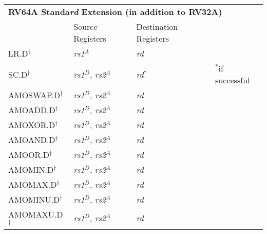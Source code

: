 \begin{tabular}{p{25mm}|p{3cm}|p{6cm}|p{10cm}}
  \multicolumn{4}{l}{\bf RV64A Standa{\em rd} Extension (in addition to RV32A)} \\
  \cline{2-3}
   & Source Registers & Destination Registers \\
  \cline{2-3}
   LR.D$^\dagger$ & {\em rs1}$^A$ & {\em rd} &  \\
   \cline{2-3}
   SC.D$^\dagger$ & {\em rs1}$^D$, {\em rs2}$^A$ & {\em rd}$^*$ & $^*$if successful \\
   \cline{2-3}
   AMOSWAP.D$^\dagger$ & {\em rs1}$^D$, {\em rs2}$^A$ & {\em rd} &  \\
   \cline{2-3}
   AMOADD.D$^\dagger$ & {\em rs1}$^D$, {\em rs2}$^A$ & {\em rd} &  \\
   \cline{2-3}
   AMOXOR.D$^\dagger$ & {\em rs1}$^D$, {\em rs2}$^A$ & {\em rd} &  \\
   \cline{2-3}
   AMOAND.D$^\dagger$ & {\em rs1}$^D$, {\em rs2}$^A$ & {\em rd} &  \\
   \cline{2-3}
   AMOOR.D$^\dagger$ & {\em rs1}$^D$, {\em rs2}$^A$ & {\em rd} &  \\
   \cline{2-3}
   AMOMIN.D$^\dagger$ & {\em rs1}$^D$, {\em rs2}$^A$ & {\em rd} &  \\
   \cline{2-3}
   AMOMAX.D$^\dagger$ & {\em rs1}$^D$, {\em rs2}$^A$ & {\em rd} &  \\
   \cline{2-3}
   AMOMINU.D$^\dagger$ & {\em rs1}$^D$, {\em rs2}$^A$ & {\em rd} &  \\
   \cline{2-3}
   AMOMAXU.D$^\dagger$ & {\em rs1}$^D$, {\em rs2}$^A$ & {\em rd} &  \\
   \cline{2-3}
\end{tabular}

